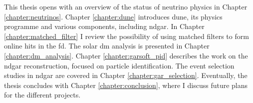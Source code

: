 This thesis opens with an overview of the status of neutrino physics in Chapter \ref{chapter:neutrinos}. Chapter \ref{chapter:dune} introduces \gls{dune}, its physics programme and various components, including \gls{ndgar}. In Chapter \ref{chapter:matched_filter} I review the possibility of using matched filters to form online hits in the \gls{fd}. The solar \gls{dm} analysis is presented in Chapter \ref{chapter:dm_analysis}. Chapter \ref{chapter:garsoft_pid} describes the work on the \gls{ndgar} reconstruction, focused on particle identification. The event selection studies in \gls{ndgar} are covered in Chapter \ref{chapter:gar_selection}. Eventually, the thesis concludes with Chapter \ref{chapter:conclusion}, where I discuss future plans for the different projects.